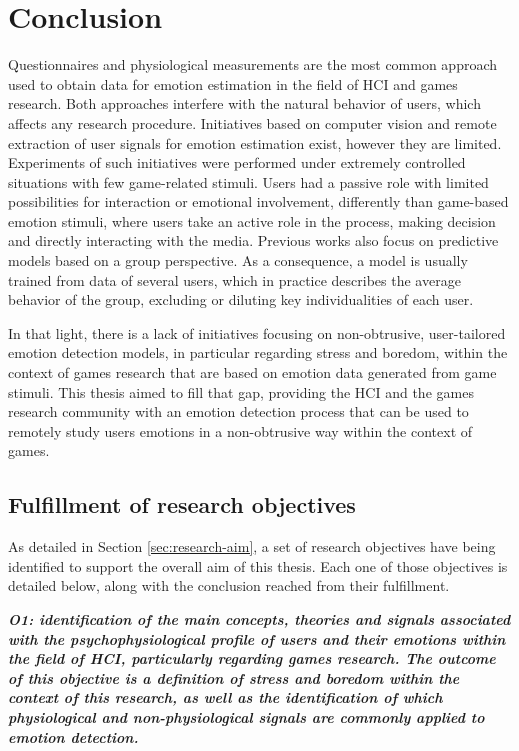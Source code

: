 \chapter{Conclusion}
\label{ch:conclusion}

Questionnaires and physiological measurements are the most common approach used to obtain data for emotion estimation in the field of HCI and games research. Both approaches interfere with the natural behavior of users, which affects any research procedure. Initiatives based on computer vision and remote extraction of user signals for emotion estimation exist, however they are limited. Experiments of such initiatives were performed under extremely controlled situations with few game-related stimuli. Users had a passive role with limited possibilities for interaction or emotional involvement, differently than game-based emotion stimuli, where users take an active role in the process, making decision and directly interacting with the media. Previous works also focus on predictive models based on a group perspective. As a consequence, a model is usually trained from data of several users, which in practice describes the average behavior of the group, excluding or diluting key individualities of each user.

In that light, there is a lack of initiatives focusing on non-obtrusive, user-tailored emotion detection models, in particular regarding stress and boredom, within the context of games research that are based on emotion data generated from game stimuli. This thesis aimed to fill that gap, providing the HCI and the games research community with an emotion detection process that can be used to remotely study users emotions in a non-obtrusive way within the context of games.

\section{Fulfillment of research objectives}

As detailed in Section \ref{sec:research-aim}, a set of research objectives have being identified to support the overall aim of this thesis. Each one of those objectives is detailed below, along with the conclusion reached from their fulfillment.

\textit{\textbf{O1: identification of the main concepts, theories and signals associated with the psychophysiological profile of users and their emotions within the field of HCI, particularly regarding games research. The outcome of this objective is a definition of stress and boredom within the context of this research, as well as the identification of which physiological and non-physiological signals are commonly applied to emotion detection.}}

